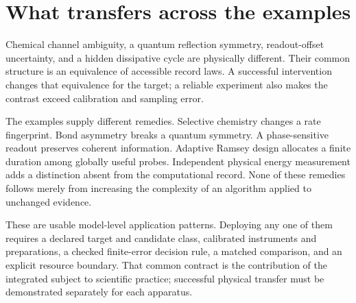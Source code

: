 \section{What transfers across the examples}

Chemical channel ambiguity, a quantum reflection symmetry, readout-offset
uncertainty, and a hidden dissipative cycle are physically different. Their
common structure is an equivalence of accessible record laws. A successful
intervention changes that equivalence for the target; a reliable experiment
also makes the contrast exceed calibration and sampling error.

The examples supply different remedies. Selective chemistry changes a rate
fingerprint. Bond asymmetry breaks a quantum symmetry. A phase-sensitive
readout preserves coherent information. Adaptive Ramsey design allocates a
finite duration among globally useful probes. Independent physical energy
measurement adds a distinction absent from the computational record. None
of these remedies follows merely from increasing the complexity of an
algorithm applied to unchanged evidence.

These are usable model-level application patterns. Deploying any one of them
requires a declared target and candidate class, calibrated instruments and
preparations, a checked finite-error decision rule, a matched comparison, and
an explicit resource boundary. That common contract is the contribution of
the integrated subject to scientific practice; successful physical transfer
must be demonstrated separately for each apparatus.
